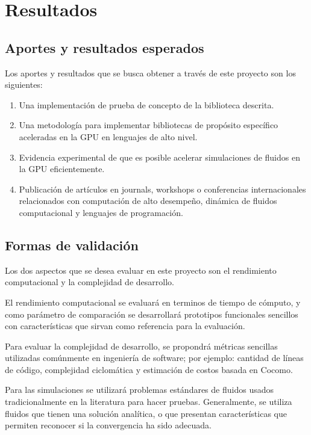 \documentclass[11pt,spanish]{article}
\begin{document}
 \newpage
\section{Resultados}

\subsection{Aportes y resultados esperados}
Los aportes y resultados que se busca obtener a través de este proyecto son los
siguientes:
\begin{enumerate}
    \item Una implementación de prueba de concepto de la biblioteca descrita.
    \item Una metodología para implementar bibliotecas de propósito específico
        aceleradas en la GPU en lenguajes de alto nivel.
    \item Evidencia experimental de que es posible acelerar simulaciones de
        fluidos en la GPU eficientemente.
    \item Publicación de artículos en journals, workshops o
        conferencias internacionales
        relacionados con
        computación de alto desempeño,
        dinámica de fluidos computacional y
        lenguajes de programación.
\end{enumerate}
 
\subsection{Formas de validación}
Los dos aspectos que se desea evaluar en este proyecto son el
rendimiento computacional y la complejidad de desarrollo.

El rendimiento computacional se evaluará en terminos de tiempo de cómputo, y
como parámetro de comparación se desarrollará prototipos funcionales sencillos
con características que sirvan como referencia para la evaluación.

Para evaluar la complejidad de desarrollo, se propondrá métricas sencillas
utilizadas comúnmente en ingeniería de software; por ejemplo: cantidad de líneas de código,
complejidad ciclomática y estimación de costos basada en Cocomo.

Para las simulaciones se utilizará problemas estándares de fluidos usados
tradicionalmente en la literatura para hacer pruebas.  Generalmente, se utiliza
fluidos que tienen una solución analítica, o que presentan características que
permiten reconocer si la convergencia ha sido adecuada.
\end{document}
